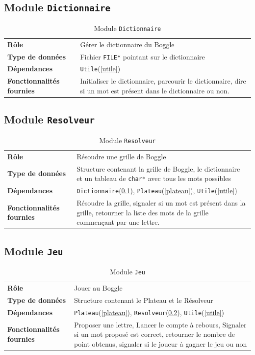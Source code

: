 \documentclass[12pt,a4paper,openany]{article}
\begin{document}
	\subsection{Module \texttt{Dictionnaire}}\label{dictionnaire}
		\begin{table}[H]
			\centering
		\begin{tabular}{p{5cm} p{12cm}}
			\textbf{Rôle} & Gérer le dictionnaire du Boggle\\
			\textbf{Type de données} & Fichier \texttt{FILE*} pointant sur le dictionnaire\\
			\textbf{Dépendances} & \texttt{Utile}(\ref{utile})\\
			\textbf{Fonctionnalités fournies} & Initialiser le dictionnaire, parcourir le dictionnaire, dire si un mot est présent dans le dictionnaire ou non. 
		\end{tabular}
		\caption{Module \texttt{Dictionnaire}}
	\end{table}
	\subsection{Module \texttt{Resolveur}}\label{resolveur}
		\begin{table}[H]
			\centering
		\begin{tabular}{p{5cm} p{12cm}}
			\textbf{Rôle} & Résoudre une grille de Boggle\\
			\textbf{Type de données} & Structure contenant la grille de Boggle, le dictionnaire et un tableau de \texttt{char*} avec tous les mots possibles\\
			\textbf{Dépendances} & \texttt{Dictionnaire}(\ref{dictionnaire}), \texttt{Plateau}(\ref{plateau}), \texttt{Utile}(\ref{utile})\\
			\textbf{Fonctionnalités fournies} & Résoudre la grille, signaler si un mot est présent dans la grille, retourner la liste des mots de la grille
			commençant par une lettre. 
		\end{tabular}
		\caption{Module \texttt{Resolveur}}
	\end{table}
	\subsection{Module \texttt{Jeu}}\label{jeu}
		\begin{table}[H]
			\centering
		\begin{tabular}{p{5cm} p{12cm}}
			\textbf{Rôle} & Jouer au Boggle \\ 
			\textbf{Type de données} & Structure contenant le Plateau et le Résolveur\\ 
			\textbf{Dépendances} & \texttt{Plateau}(\ref{plateau}), \texttt{Resolveur}(\ref{resolveur}), \texttt{Utile}(\ref{utile})\\
			\textbf{Fonctionnalités fournies} & Proposer une lettre, Lancer le compte à rebours, Signaler si un mot proposé est correct, retourner le nombre de
			point obtenus, signaler si le joueur à gagner le jeu ou non
		\end{tabular}
		\caption{Module \texttt{Jeu}}
	\end{table}
\end{document}
